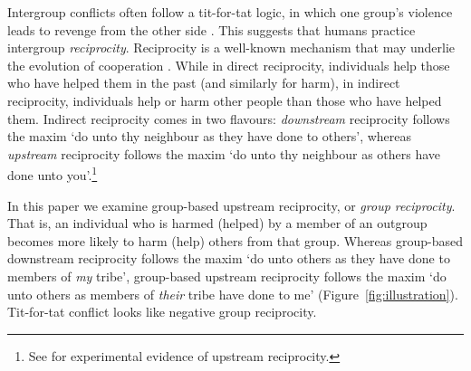 \documentclass[12pt,a4paper]{article}\usepackage[]{graphicx}\usepackage[]{color}
\begin{document}
Intergroup conflicts often follow a tit-for-tat logic, in which one group's
violence leads to revenge from the other side
\citep{horowitz2001thedeadly,horowitz1985ethnicgroups,chagnon1988lifehistories,haushofer_both_2010,shayo2010judicial}.
This suggests that humans practice intergroup \emph{reciprocity}. Reciprocity is
a well-known mechanism that may underlie the evolution of cooperation
\citep{nowak2006five,nowak2012evolving}. While in direct reciprocity,
individuals help those who have helped them in the past (and similarly for
harm), in indirect reciprocity, individuals help or harm other people than those
who have helped them.  Indirect reciprocity comes in two flavours:
\emph{downstream} reciprocity follows the maxim `do unto thy neighbour as they
have done to others', whereas \emph{upstream} reciprocity follows the maxim `do
unto thy neighbour as others have done unto you'.\footnote{
See \citet{greiner2005indirect,tsvetkova2015social,tsvetkova2014social,guth2001trust} for experimental evidence of upstream reciprocity.
}

In this paper we examine
group-based upstream reciprocity, or \emph{group reciprocity}. That is, an
individual who is harmed (helped) by a member of an outgroup becomes more likely
to harm (help) others from that group.  Whereas group-based downstream
reciprocity \citep{bernhard2006group,bernhard2006parochial} follows the maxim
`do unto others as they have done to members of \emph{my} tribe', group-based
upstream reciprocity follows the maxim `do unto others as members of
\emph{their} tribe have done to me' (Figure~\ref{fig:illustration}). Tit-for-tat conflict looks like negative group reciprocity.
\end{document}
